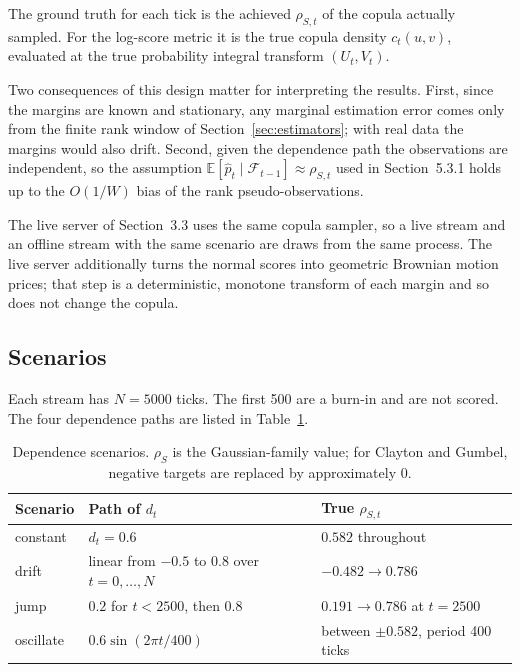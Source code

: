 The ground truth for each tick is the achieved $\rho_{S,t}$ of the copula actually sampled. For
the log-score metric it is the true copula density $c_t(u,v)$, evaluated at the true
probability integral transform $(U_t,V_t)$.

Two consequences of this design matter for interpreting the results. First, since the margins are
known and stationary, any marginal estimation error comes only from the finite rank window of
Section~\ref{sec:estimators}; with real data the margins would also drift. Second, given the
dependence path the observations are independent, so the assumption
$\mathbb E[\hat p_t\mid\mathcal F_{t-1}]\approx\rho_{S,t}$ used in Section~5.3.1 holds up to the
$O(1/W)$ bias of the rank pseudo-observations.

The live server of Section~3.3 uses the same copula sampler, so a live stream and an offline
stream with the same scenario are draws from the same process. The live server additionally turns
the normal scores into geometric Brownian motion prices; that step is a deterministic, monotone
transform of each margin and so does not change the copula.

\subsection{Scenarios}

Each stream has $N=5000$ ticks. The first 500 are a burn-in and are not scored. The four
dependence paths are listed in Table~\ref{tab:scenarios}.

\begin{table}[ht]
  \centering
  \caption{Dependence scenarios. $\rho_S$ is the Gaussian-family value; for Clayton and Gumbel,
    negative targets are replaced by approximately $0$.}
  \label{tab:scenarios}
  \begin{tabular}{lll}
    \toprule
    Scenario & Path of $d_t$ & True $\rho_{S,t}$ \\
    \midrule
    constant  & $d_t=0.6$ & $0.582$ throughout \\
    drift     & linear from $-0.5$ to $0.8$ over $t=0,\dots,N$ & $-0.482\to0.786$ \\
    jump      & $0.2$ for $t<2500$, then $0.8$ & $0.191\to0.786$ at $t=2500$ \\
    oscillate & $0.6\sin(2\pi t/400)$ & between $\pm0.582$, period 400 ticks \\
    \bottomrule
  \end{tabular}
\end{table}

